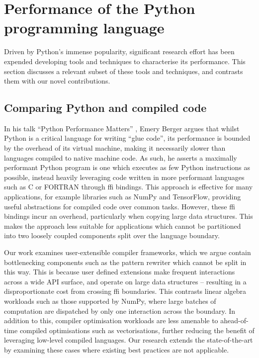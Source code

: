 \section{Performance of the Python programming language}
\label{sec:python-performance}

Driven by Python's immense popularity, significant research effort has been expended developing tools and techniques to characterise its performance.
This section discusses a relevant subset of these tools and techniques, and contrasts them with our novel contributions.


\subsection{Comparing Python and compiled code}
\label{sec:python-performance-comparing}

In his talk ``Python Performance Matters'' \cite{emerybergerPythonPerformanceMatters2022}, Emery Berger argues that whilst Python is a critical language for writing ``glue code'', its performance is bounded by the overhead of its virtual machine, making it necessarily slower than languages compiled to native machine code.
As such, he asserts a maximally performant Python program is one which executes as few Python instructions as possible, instead heavily leveraging code written in more performant languages such as C or FORTRAN through \ac{ffi} bindings.
This approach is effective for many applications, for example libraries such as NumPy and TensorFlow, providing useful abstractions for compiled code over common tasks.
However, these \ac{ffi} bindings incur an overhead, particularly when copying large data structures.
This makes the approach less suitable for applications which cannot be partitioned into two loosely coupled components split over the language boundary.

Our work examines user-extensible compiler frameworks, which we argue contain bottlenecking components such as the pattern rewriter which cannot be split in this way.
This is because user defined extensions make frequent interactions across a wide API surface, and operate on large data structures -- resulting in a disproportionate cost from crossing \ac{ffi} boundaries. This contrasts linear algebra workloads such as those supported by NumPy, where large batches of computation are dispatched by only one interaction across the boundary.
In addition to this, compiler optimisation workloads are less amenable to ahead-of-time compiled optimisations such as vectorisations, further reducing the benefit of leveraging low-level compiled languages.
Our research extends the state-of-the-art by examining these cases where existing best practices are not applicable.


